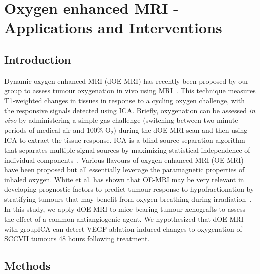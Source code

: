
\chapter{Oxygen enhanced MRI - Applications and Interventions}
\label{ch:oemri3}

\section{Introduction}

Dynamic oxygen enhanced MRI (\ac{dOE-MRI}) has recently been proposed by our group to assess tumour oxygenation in vivo using MRI~\cite{Moosvi:2018ca}. 
This technique measures T1-weighted changes in tissues in response to a cycling oxygen challenge, with the responsive signals detected using \ac{ICA}. 
Briefly, oxygenation can be assessed \emph{in vivo} by administering a simple gas challenge (switching between two-minute periods of medical air and 100\% O$_2$) during the \ac{dOE-MRI} scan and then using \ac{ICA} to extract the tissue response.
\ac{ICA} is a blind-source separation algorithm that separates multiple signal sources by maximizing statistical independence of individual components~\cite{Hyvarinen:2000vk}.
Various flavours of oxygen-enhanced MRI (OE-MRI) have been proposed but all essentially leverage the paramagnetic properties of inhaled oxygen.
White et al. has shown that OE-MRI may be very relevant in developing prognostic factors to predict tumour response to hypofractionation by stratifying tumours that may benefit from oxygen breathing during irradiation~\cite{White:2016fz}.
In this study, we apply \ac{dOE-MRI} to mice bearing tumour xenografts to assess the effect of a common antiangiogenic agent.
We hypothesized that \ac{dOE-MRI} with group\ac{ICA} can detect VEGF ablation-induced changes to oxygenation of SCCVII tumours 48 hours following treatment.

\section{Methods}
